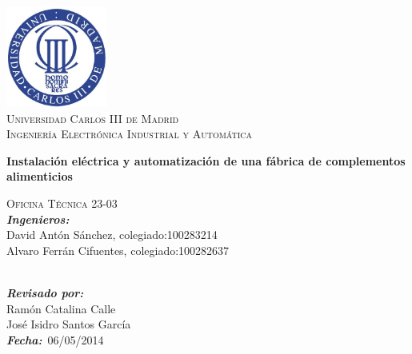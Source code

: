 \begin{titlepage}

\begin{center}


\includegraphics[width=0.25\textwidth]{./uc3m.jpg}\\[2cm]    
\textsc{\huge Universidad Carlos III de Madrid}\\[0.5cm]
\textsc{\LARGE Ingeniería Electrónica Industrial y Automática}\\[0.5cm]
\vspace{4cm}

{\LARGE \bfseries{Instalación eléctrica y automatización de una fábrica de complementos alimenticios}\\[4.5cm]}


\end{center}
\setlength{\parindent}{0cm}


\vspace{10pt}
\textsc{\Large Oficina Técnica 23-03}\\

\emph{\bfseries{Ingenieros:}}\\
David Antón Sánchez, colegiado:100283214\\
Alvaro Ferrán Cifuentes, colegiado:100282637\\\




\emph{\bfseries{Revisado por:}}\\
Ramón Catalina Calle\\
José Isidro Santos García\\


\emph{\bfseries{Fecha:}}\ 06/05/2014\\

\end{titlepage}